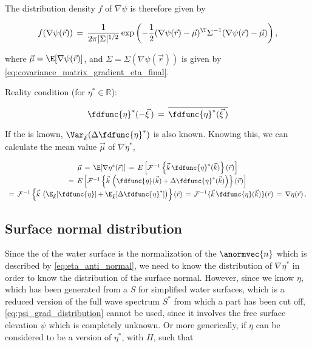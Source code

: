 {The distribution density $f$ of $\nabla\psi$ is therefore given by

\begin{equation} \label{eq:psi_grad_distribution}
f(\nabla\psi(\vec{r})) \,=\, \frac{1}{2\pi|\Sigma|^{1/2}}\exp\left(-\frac{1}{2}(\nabla\psi(\vec{r})-\vec{\mu})^{\T}\Sigma^{-1}(\nabla\psi(\vec{r})-\vec{\mu})\right),
\end{equation}

where $\vec{\mu} = \E[\nabla\psi(\vec{r})]$, and $\Sigma = \Sigma(\nabla\psi(\vec{r}))$ is given by \eqref{eq:covariance_matrix_gradient_eta_final}.

\comment
{
\HRule

Reality condition (for $\eta^*\in\mathbb{R}$):

\begin{equation}
\fdfunc{\eta}^*(-\vec{\xi}\,) \,=\, \overline{\fdfunc{\eta}^*(\vec{\xi}\,)}
\end{equation}

\HRule

If the  is known, $\Var_{\vec{k}}(\Delta\fdfunc{\eta}^*)$ is also known. Knowing this, we can calculate the mean value $\vec{\mu}$ of $\nabla\eta^*$,

\begin{equation}
\renewcommand*{\arraystretch}{1.5}
\begin{array}{c}
\vec{\mu} \,=\, \E[\nabla\eta^*(\vec{r})] \,=\, E\left[\mathcal{F}^{-1}\left\{\vec{k}\,\fdfunc{\eta}^*(\vec{k})\right\}(\vec{r})\right] \\
=\, E\left[\mathcal{F}^{-1}\left\{\vec{k}\,\left(\fdfunc{\eta}(\vec{k})+\Delta\fdfunc{\eta}^*(\vec{k})\right)\right\}(\vec{r})\right] \\
=\, \mathcal{F}^{-1}\left\{\vec{k}\,\left(\E_{\vec{k}}[\fdfunc{\eta}]+\E_{\vec{k}}[\Delta\fdfunc{\eta}^*]\right)\right\}(\vec{r}) \,=\, \mathcal{F}^{-1}\{\vec{k}\,\fdfunc{\eta}(\vec{k})\}(\vec{r}) \,=\, \nabla\eta(\vec{r})\,.
\end{array}
\end{equation}

\HRule
}

\subsection{Surface normal distribution}

Since the  of the water surface is the normalization of the  $\anormvec{n}$ which is described by \eqref{eq:eta_anti_normal}, we need to know the distribution of $\nabla\eta^*$ in order to know the distribution of the surface normal. However, since we know $\eta$, which has been generated from a  $S$ for simplified water surfaces, which is a reduced version of the full wave spectrum $S^*$ from which a part has been cut off, \eqref{eq:psi_grad_distribution} cannot be used, since it involves the free surface elevation $\psi$ which is completely unknown. Or more generically, if $\eta$ can be considered to be a  version of $\eta^*$, with  $H$, such that

}
